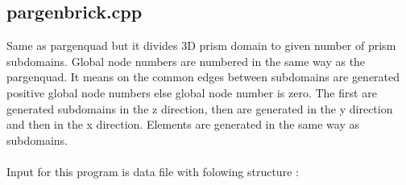 \documentclass[12pt]{book}
\begin{document}
\subsection{pargenbrick.cpp}

Same as pargenquad but it divides 3D prism domain to given number of prism subdomains.
Global node numbers are numbered in the same way as the pargenquad. It means on the common edges
between subdomains are generated positive global node numbers else global node number is zero.
The first are generated subdomains in the z direction, then are generated in the y direction and
then in the x direction. Elements are generated in the same way as subdomains.\\
\\
Input for this program is data file with folowing structure :\\
\end{document}
